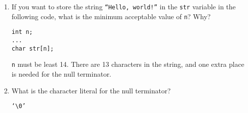 \begin{enumerate}
\item If you want to store the string \texttt{``Hello, world!''} in the \texttt{str} variable in the following code, what is the minimum acceptable value of \texttt{n}? Why?
\begin{lstlisting}[numbers=none]
int n;
...
char str[n];
\end{lstlisting}

\begin{answer}
\texttt{n} must be least 14.
There are 13 characters in the string, and one extra place is needed for the null terminator.
\end{answer}

\item What is the character literal for the null terminator?

\begin{answer}
\texttt{`\textbackslash0'}
\end{answer}

\end{enumerate}
